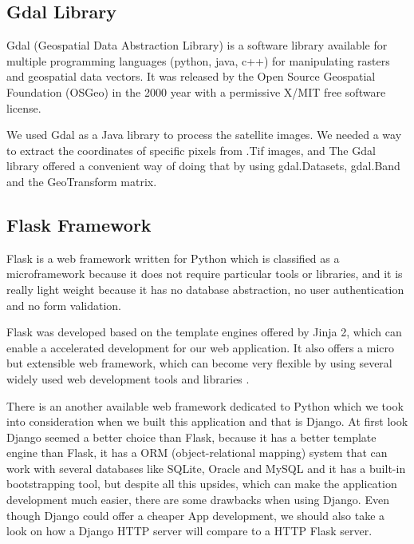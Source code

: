 \documentclass[12pt, a4paper]{report}
\begin{document}
\subsection{Gdal Library}

\quad
Gdal (Geospatial Data Abstraction Library) is a software library available for multiple programming languages (python, java, c++) for manipulating rasters and geospatial data vectors. It was released by the Open Source Geospatial Foundation (OSGeo) in the 2000 year with a permissive X/MIT free software license\cite{Gdal}. 
\par 

We used Gdal as a Java library to process the satellite images. We needed a way to extract the coordinates of specific pixels from .Tif images, and The Gdal library offered a convenient way of doing that by using gdal.Datasets, gdal.Band and the GeoTransform matrix.

\subsection{Flask Framework}

\quad
Flask is a web framework written for Python which is classified as a microframework because it does not require particular tools or libraries, and it is really light weight because it has no database abstraction, no user authentication and no form validation.
\par 

Flask was developed based on the template engines offered by Jinja 2, which can enable a accelerated development for our web application. It also offers a micro but extensible web framework, which can become very flexible by using several widely used web development tools and libraries \cite{Flask1}.
\par 

There is an another available web framework dedicated to Python which we took into consideration when we built this application and that is Django. At first look Django seemed a better choice than Flask, because it has a better template engine than Flask, it has a ORM (object-relational mapping) system that can work with several databases like SQLite, Oracle and MySQL and it has a built-in bootstrapping tool, but despite all this upsides, which can make the application development much easier, there are some drawbacks when using Django. Even though Django could offer a cheaper App development, we should also take a look on how a Django HTTP server will compare to a HTTP Flask server.
\par 
\end{document}
